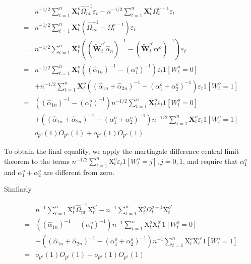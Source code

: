 \documentclass[10pt]{article}
\begin{document}
$$
\begin{aligned}
& n^{-1 / 2} \sum_{t=1}^{n} \mathbf{X}_{t}^{o} \hat{\Omega}_{n t}^{-1} \varepsilon_{t}-n^{-1 / 2} \sum_{t=1}^{n} \mathbf{X}_{t}^{o} \Omega_{t}^{o-1} \varepsilon_{t} \\
= & n^{-1 / 2} \sum_{t=1}^{n} \mathbf{X}_{t}^{o}\left(\hat{\Omega}_{n t}^{-1}-\Omega_{t}^{o-1}\right) \varepsilon_{t} \\
= & n^{-1 / 2} \sum_{t=1}^{n} \mathbf{X}_{t}^{o}\left(\left(\tilde{\mathbf{W}}_{t}^{o \prime} \hat{\alpha}_{n}\right)^{-1}-\left(\tilde{\mathbf{W}}_{t}^{o \prime} \boldsymbol{\alpha}^{o}\right)^{-1}\right) \varepsilon_{t} \\
= & n^{-1 / 2} \sum_{t=1}^{n} \mathbf{X}_{t}^{o}\left(\left(\hat{\alpha}_{1 n}\right)^{-1}-\left(\alpha_{1}^{o}\right)^{-1}\right) \varepsilon_{t} 1\left[W_{t}^{o}=0\right] \\
& +n^{-1 / 2} \sum_{t=1}^{n} \mathbf{X}_{t}^{o}\left(\left(\hat{\alpha}_{1 n}+\hat{\alpha}_{2 n}\right)^{-1}-\left(\alpha_{1}^{o}+\alpha_{2}^{o}\right)^{-1}\right) \varepsilon_{t} 1\left[W_{t}^{o}=1\right] \\
= & \left(\left(\hat{\alpha}_{1 n}\right)^{-1}-\left(\alpha_{1}^{o}\right)^{-1}\right) n^{-1 / 2} \sum_{t=1}^{n} \mathbf{X}_{t}^{o} \varepsilon_{t} 1\left[W_{t}^{o}=0\right] \\
& +\left(\left(\hat{\alpha}_{1 n}+\hat{\alpha}_{2 n}\right)^{-1}-\left(\alpha_{1}^{o}+\alpha_{2}^{o}\right)^{-1}\right) n^{-1 / 2} \sum_{t=1}^{n} \mathbf{X}_{t}^{o} \varepsilon_{t} 1\left[W_{t}^{o}=1\right] \\
= & o_{p^{o}}(1) O_{p^{o}}(1)+o_{p^{o}}(1) O_{p^{o}}(1)
\end{aligned}
$$

To obtain the final equality, we apply the martingale difference central limit theorem to the terms $n^{-1 / 2} \sum_{t=1}^{n} \mathrm{X}_{t}^{o} \varepsilon_{t} 1\left[W_{t}^{o}=j\right], j=0,1$, and require that $\alpha_{1}^{o}$ and $\alpha_{1}^{o}+\alpha_{2}^{o}$ are different from zero.

Similarly

$$
\begin{aligned}
& n^{-1} \sum_{t=1}^{n} \mathrm{X}_{t}^{o} \hat{\Omega}_{n t}^{-1} \mathrm{X}_{t}^{o \prime}-n^{-1} \sum_{t=1}^{n} \mathrm{X}_{t}^{o} \Omega_{t}^{o-1} \mathrm{X}_{t}^{o \prime} \\
= & \left(\left(\hat{\alpha}_{1 n}\right)^{-1}-\left(\alpha_{1}^{o}\right)^{-1}\right) n^{-1} \sum_{t=1}^{n} \mathrm{X}_{t}^{o} \mathrm{X}_{t}^{o \prime} 1\left[W_{t}^{o}=0\right] \\
& +\left(\left(\hat{\alpha}_{1 n}+\hat{\alpha}_{2 n}\right)^{-1}-\left(\alpha_{1}^{o}+\alpha_{2}^{o}\right)^{-1}\right) n^{-1} \sum_{t=1}^{n} \mathrm{X}_{t}^{o} \mathrm{X}_{t}^{o \prime} 1\left[W_{t}^{o}=1\right] \\
= & o_{p^{o}}(1) O_{p^{o}}(1)+o_{p^{o}}(1) O_{p^{o}}(1)
\end{aligned}
$$
\end{document}
